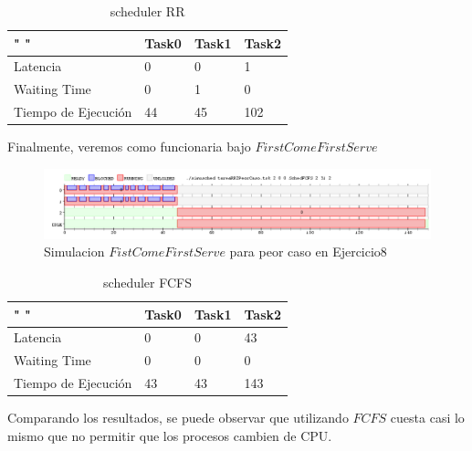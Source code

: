 \documentclass[11pt]{article}
\begin{document}
\begin{enumerate}
  \begin{table}[htb]
  \centering
  \begin{tabular}{| l | l | l | l |}
  \hline
  " " & Task0 & Task1 & Task2 \\
  \hline \hline
  Latencia & 0 & 0 & 1 \\ \hline
  Waiting Time & 0 & 1 & 0 \\ \hline
  Tiempo de Ejecución & 44 & 45 & 102 \\ \hline
  \end{tabular}
  \caption{scheduler RR}
  \end{table}


  Finalmente, veremos como funcionaria bajo $First Come First Serve$

    \begin{figure}[H]
      \includegraphics[scale=0.5]{Ej8PeorCasoFCFS}
      \caption{Simulacion $Fist Come First Serve$ para peor caso en Ejercicio8}
    \end{figure}

  \begin{table}[htb]
  \centering
  \begin{tabular}{| l | l | l | l |}
  \hline
  " " & Task0 & Task1 & Task2 \\
  \hline \hline
  Latencia & 0 & 0 & 43 \\ \hline
  Waiting Time & 0 & 0 & 0 \\ \hline
  Tiempo de Ejecución & 43 & 43 & 143 \\ \hline
  \end{tabular}
  \caption{scheduler FCFS}
  \end{table}


  Comparando los resultados, se puede observar que utilizando $FCFS$ cuesta casi lo mismo que no permitir que los procesos cambien de CPU.



\end{enumerate}
\end{document}
